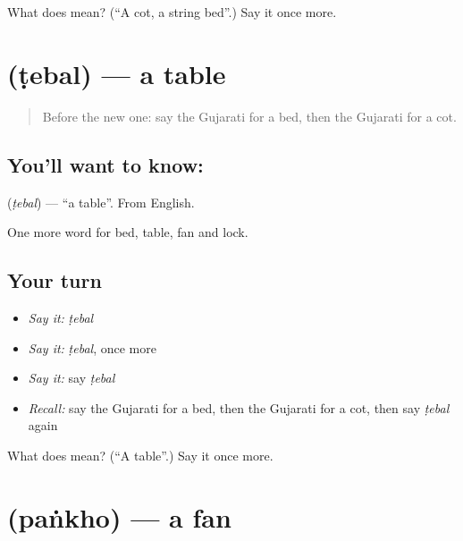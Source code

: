 \begin{tcolorbox}[breakable,colback=teal!4,colframe=teal!35!black,title={Before you move on}]
What does  mean? (\textquotedblleft{}A cot, a string bed\textquotedblright{}.) Say it once more.
\end{tcolorbox}
\section[\texorpdfstring{\gu{ટેબલ} (ṭebal)}{ટેબલ (ṭebal)}]{ (ṭebal) — a table}

\label{lesson:GU-C62-table}



\begin{quote}
Before the new one: say the Gujarati for a bed, then the Gujarati for a cot.
\end{quote}

\subsection*{You'll want to know: }
\textbf{} (\emph{ṭebal}) — \textquotedblleft{}a table\textquotedblright{}. From English.

\begin{grammarlens}[title={What you've built}]
One more word for bed, table, fan and lock.
\end{grammarlens}

\subsection*{Your turn}
\begin{itemize}
\raggedright
  \item \emph{Say it:} \emph{ṭebal}
  \item \emph{Say it:} \emph{ṭebal}, once more
  \item \emph{Say it:} say \emph{ṭebal}
  \item \emph{Recall:} say the Gujarati for a bed, then the Gujarati for a cot, then say \emph{ṭebal} again
\end{itemize}

\begin{tcolorbox}[breakable,colback=teal!4,colframe=teal!35!black,title={Before you move on}]
What does  mean? (\textquotedblleft{}A table\textquotedblright{}.) Say it once more.
\end{tcolorbox}
\section[\texorpdfstring{\gu{પંખો} (paṅkho)}{પંખો (paṅkho)}]{ (paṅkho) — a fan}

